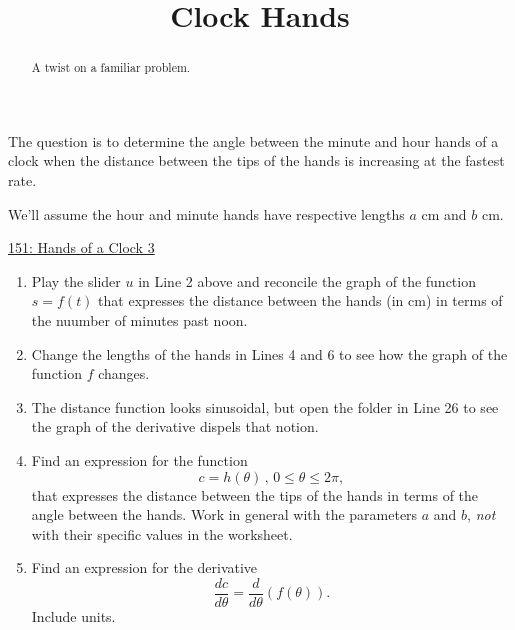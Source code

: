 \documentclass{ximera}
\title{Clock Hands}
\begin{document}
\begin{abstract}
A twist on a familiar problem.
\end{abstract}
\maketitle


\begin{question}
The question is to determine the angle between the minute and hour hands of a clock when the distance between the tips of the hands is increasing at the fastest rate.

We'll assume the hour and minute hands have respective lengths $a$ cm and $b$ cm.


\begin{onlineOnly}
    \begin{center}
\end{center}
\end{onlineOnly}

\href{https://www.desmos.com/calculator/efhex45zkr}{151: Hands of a Clock 3}

\begin{enumerate}

\item Play the slider $u$ in Line 2 above and reconcile the graph of the function $s=f(t)$ that expresses the distance between the hands (in cm) in terms of the nuumber of minutes past noon.

\item Change the lengths of the hands in Lines 4 and 6 to see how the graph of the function $f$ changes.

\item The distance function looks sinusoidal, but open the folder in Line 26 to see the graph of the derivative dispels that notion. 

\item Find an expression for the function 
\[
  c=h(\theta) \, , \, 0\leq \theta \leq 2\pi ,
\]
that expresses the distance between the tips of the hands in terms of the angle between the hands. Work in general with the parameters $a$ and $b$, \emph{not} with their specific values in the worksheet.

\item Find an expression for the derivative
\[
  \frac{dc}{d\theta} = \frac{d}{d\theta}\left( f(\theta) \right) .
\]
Include units.


\end{enumerate}
\end{question}
\end{document}
